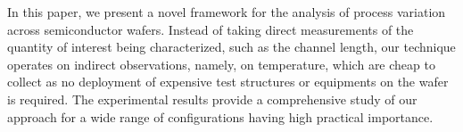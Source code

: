 In this paper, we present a novel framework for the analysis of process variation across semiconductor wafers. Instead of taking direct measurements of the quantity of interest being characterized, such as the channel length, our technique operates on indirect observations, namely, on temperature, which are cheap to collect as no deployment of expensive test structures or equipments on the wafer is required.
The experimental results provide a comprehensive study of our approach for a wide range of configurations having high practical importance.
